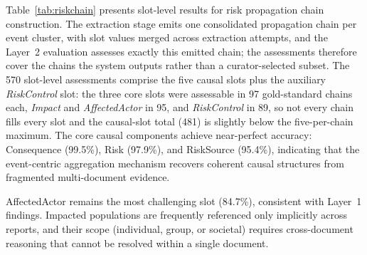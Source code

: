 \documentclass[a4paper,fleqn]{cas-dc}
\begin{document}
Table~\ref{tab:riskchain} presents slot-level results for risk
propagation chain construction.
The extraction stage emits one consolidated propagation chain per
event cluster, with slot values merged across extraction attempts,
and the Layer~2 evaluation assesses exactly this emitted chain; the
assessments therefore cover the chains the system outputs rather
than a curator-selected subset.
The 570 slot-level assessments comprise the five causal slots plus
the auxiliary \textit{RiskControl} slot: the three core slots were
assessable in 97 gold-standard chains each, \textit{Impact} and
\textit{AffectedActor} in 95, and \textit{RiskControl} in 89, so not
every chain fills every slot and the causal-slot total (481) is
slightly below the five-per-chain maximum.
The core causal components achieve near-perfect accuracy: Consequence
(99.5\%), Risk (97.9\%), and RiskSource (95.4\%), indicating
that the event-centric aggregation mechanism recovers
coherent causal structures from fragmented multi-document evidence.

AffectedActor remains the most challenging slot (84.7\%), consistent
with Layer~1 findings.
Impacted populations are frequently referenced only implicitly across
reports, and their scope (individual, group, or societal)
requires cross-document reasoning that cannot be resolved
within a single document.

\begin{table}[t]
  \centering
  \caption{Risk propagation chain and auxiliary control-slot results (after
           adjudication).}
  \label{tab:riskchain}
  \footnotesize
  \setlength{\tabcolsep}{3pt}
\end{table}
\end{document}
